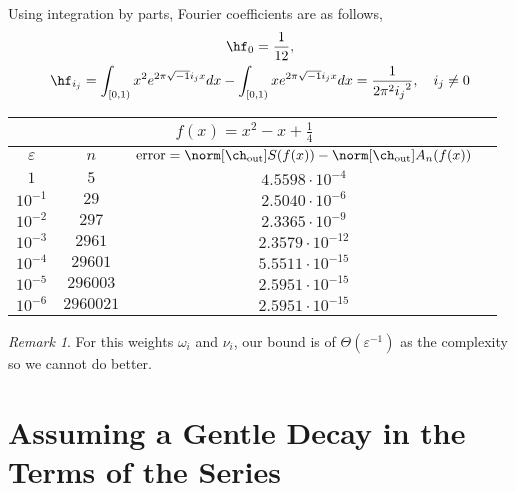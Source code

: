 \documentclass[final]{elsarticle}
\newcommand{\chout}{\ch_{\text{\rm{out}}}}
\theoremstyle{definition}
\theoremstyle{remark}
\newtheorem{rem}{Remark}
\begin{document}
Using integration by parts, Fourier coefficients are as follows,
\begin{gather*}
\hf_{0}=\frac{1}{12},\\
\hf_{i_j}=\int_{[0,1)}x^2e^{2\pi\sqrt{-1}i_jx}dx-\int_{[0,1)}xe^{2\pi\sqrt{-1}i_jx}dx=\frac{1}{2\pi^2{i_j}^2}, \quad i_j\neq 0
\end{gather*}

\begin{center}
\begin{tabular}{|c|c|c|c|}
  \hline
  \multicolumn{3}{|c|}{$f(x)=x^2-x+\frac{1}{4}$} \\
  \hline
  $\varepsilon$ & $n$ & $\operatorname{error}=\norm[\chout]{S(f(x))}-\norm[\chout]{A_{n}(f(x))}$ \\
  \hline
  $1$ & $5$ & $4.5598\cdot10^{-4}$ \\
  $10^{-1}$ & $29$ & $2.5040\cdot10^{-6}$ \\
  $10^{-2}$ & $297$ & $2.3365\cdot10^{-9}$ \\
  $10^{-3}$ & $2961$ & $2.3579\cdot10^{-12}$ \\
  $10^{-4}$ & $29601$ & $5.5511\cdot10^{-15}$ \\
  $10^{-5}$ & $296003$ & $2.5951\cdot10^{-15}$ \\
  $10^{-6}$ & $2960021$ & $2.5951\cdot10^{-15}$ \\
  \hline
\end{tabular}
\end{center}

\begin{rem}
For this weights $\omega_i$ and $\nu_i$, our bound is of $\Theta(\varepsilon^{-1})$ as the complexity so we cannot do better.
\end{rem}

\section{Assuming a Gentle Decay in the Terms of the Series}
\end{document}
